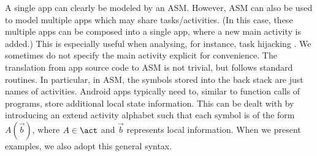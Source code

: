 {%

\begin{remark}
A single app can clearly be modeled by an ASM. However, ASM can also be used to model multiple apps which may share tasks/activities. (In this case, these multiple apps can be composed into a single app, where a new main activity is added.)  This is especially useful when analysing, for instance, task hijacking \cite{RZXWL15}.
We sometimes do not specify the main activity explicit for convenience. The translation from app source code to ASM is not trivial, but follows standard routines. In particular, in ASM, the symbols stored into the back stack are just names of activities. Android apps typically need to, similar to function calls of programs, store additional local state information. %
This can be dealt with by introducing an extend activity alphabet such that each symbol is of the form
$A(\vec{b})$, where $A \in \act$ and $\vec{b}$ represents local information.
When we present examples, we also adopt this general syntax. %
\end{remark}


}
